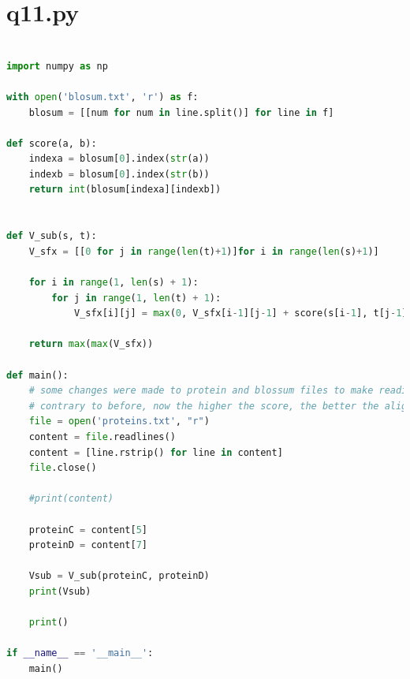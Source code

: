 \documentclass{article}
\begin{document}
	\section{q11.py}
	\label{ap:q11}
	\begin{lstlisting}[language=python]

import numpy as np

with open('blosum.txt', 'r') as f:
    blosum = [[num for num in line.split()] for line in f]

def score(a, b):
    indexa = blosum[0].index(str(a))
    indexb = blosum[0].index(str(b))
    return int(blosum[indexa][indexb])


def V_sub(s, t):
    V_sfx = [[0 for j in range(len(t)+1)]for i in range(len(s)+1)]

    for i in range(1, len(s) + 1):
        for j in range(1, len(t) + 1):
            V_sfx[i][j] = max(0, V_sfx[i-1][j-1] + score(s[i-1], t[j-1]), V_sfx[i-1][j] -2, V_sfx[i][j-1]-2)

    return max(max(V_sfx))

def main():
    # some changes were made to protein and blossum files to make reading them easier
    # contrary to before, now the higher the score, the better the alignment.
    file = open('proteins.txt', "r")
    content = file.readlines()
    content = [line.rstrip() for line in content]
    file.close()
    
    #print(content)

    proteinC = content[5]
    proteinD = content[7]
    
    Vsub = V_sub(proteinC, proteinD)
    print(Vsub)

    print()

if __name__ == '__main__':
    main()
	\end{lstlisting}
\end{document}
